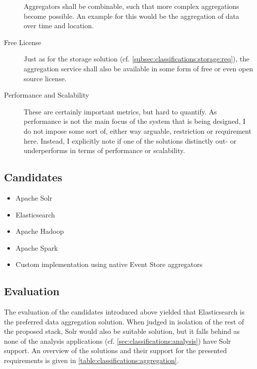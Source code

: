 \begin{description}
Aggregators shall be combinable, such that more complex aggregations become possible.
An example for this would be the aggregation of data over time and location.
\item [Free License]
Just as for the storage solution (cf. \cref{subsec:classifications:storage:req}), the aggregation service shall also be available in some form of free or even open source license.
\item [Performance and Scalability]
These are certainly important metrics, but hard to quantify.
As performance is not the main focus of the system that is being designed, I do not impose some sort of, either way arguable, restriction or requirement here.
Instead, I explicitly note if one of the solutions distinctly out- or underperforms in terms of performance or scalability.
\end{description}

\subsection{Candidates}

\begin{itemize}[noitemsep]
\item Apache Solr
\item Elasticsearch
\item Apache Hadoop
\item Apache Spark
\item Custom implementation using native Event Store aggregators
\end{itemize}

\subsection{Evaluation}


The evaluation of the candidates introduced above yielded that Elasticsearch is the preferred data aggregation solution.
When judged in isolation of the rest of the proposed stack, Solr would also be suitable solution, but it falls behind as none of the analysis applications (cf. \cref{sec:classifications:analysis}) have Solr support.
An overview of the solutions and their support for the presented requirements is given in \cref{table:classifications:aggregation}.

